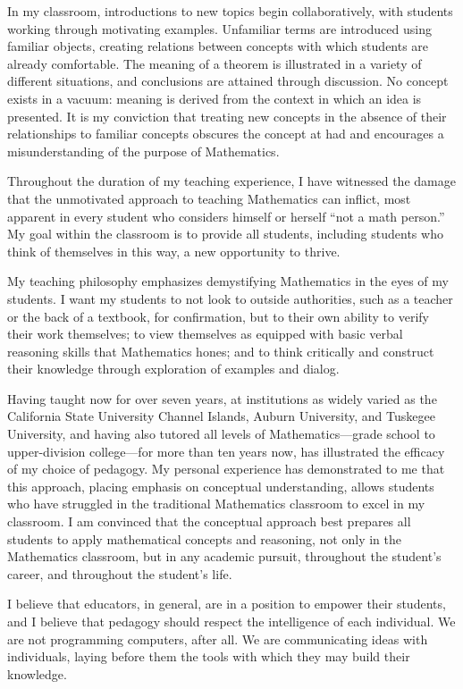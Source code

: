\documentclass[11pt]{article}
\begin{document}
In my classroom, introductions to new topics begin collaboratively, with students working through motivating examples. Unfamiliar terms are introduced using familiar objects, creating relations between concepts with which students are already comfortable. The meaning of a theorem is illustrated in a variety of different situations, and conclusions are attained through discussion. No concept exists in a vacuum: meaning is derived from the context in which an idea is presented. It is my conviction that treating new concepts in the absence of their relationships to familiar concepts obscures the concept at had and encourages a misunderstanding of the purpose of Mathematics.

Throughout the duration of my teaching experience, I have witnessed the damage that the unmotivated approach to teaching Mathematics can inflict, most apparent in every student who considers himself or herself ``not a math person.'' My goal within the classroom is to provide all students, including students who think of themselves in this way, a new opportunity to thrive.

My teaching philosophy emphasizes demystifying Mathematics in the eyes of my students. I want my students to not look to outside authorities, such as a teacher or the back of a textbook, for confirmation, but to their own ability to verify their work themselves; to view themselves as equipped with basic verbal reasoning skills that Mathematics hones; and to think critically and construct their knowledge through exploration of examples and dialog.

Having taught now for over seven years, at institutions as widely varied as the California State University Channel Islands, Auburn University, and Tuskegee University, and having also tutored all levels of Mathematics---grade school to upper-division college---for more than ten years now, has illustrated the efficacy of my choice of pedagogy. My personal experience has demonstrated to me that this approach, placing emphasis on conceptual understanding, allows students who have struggled in the traditional Mathematics classroom to excel in my classroom. I am convinced that the conceptual approach best prepares all students to apply mathematical concepts and reasoning, not only in the Mathematics classroom, but in any academic pursuit, throughout the student's career, and throughout the student's life.

I believe that educators, in general, are in a position to empower their students, and I believe that pedagogy should respect the intelligence of each individual. We are not programming computers, after all. We are communicating ideas with individuals, laying before them the tools with which they may build their knowledge.

\label{page:last}
\end{document}
